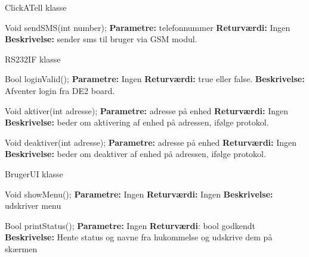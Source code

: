 {\centering ClickATell klasse}

Void sendSMS(int number);
\textbf{Parametre:} telefonnummer 
\textbf{Returværdi:} Ingen
\textbf{Beskrivelse:} sender sms til bruger via GSM modul.

{\centering RS232IF klasse}

Bool loginValid();
\textbf{Parametre:} Ingen 
\textbf{Returværdi:} true eller false.
\textbf{Beskrivelse:} Afventer login fra DE2 board.

Void aktiver(int adresse);
\textbf{Parametre:} adresse på enhed 
\textbf{Returværdi:} Ingen
\textbf{Beskrivelse:} beder om aktivering af enhed på adressen, ifølge protokol.


Void deaktiver(int adresse);
\textbf{Parametre:} adresse på enhed
\textbf{Returværdi:} Ingen
\textbf{Beskrivelse:} beder om deaktiver af enhed på adressen, ifølge protokol.

{\centering BrugerUI klasse}

Void showMenu();
\textbf{Parametre:} Ingen 
\textbf{Returværdi:} Ingen
\textbf{Beskrivelse:} udskriver menu

Bool printStatus();
\textbf{Parametre:} Ingen 
\textbf{Returværdi}: bool godkendt
\textbf{Beskrivelse:} Hente status og navne fra hukommelse og udskrive dem på skærmen












